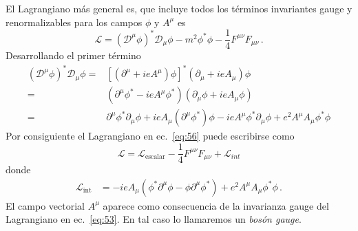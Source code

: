 El Lagrangiano m\'as general es, que incluye todos los t\'erminos invariantes gauge y renormalizables para los campos $\phi$ y $A^\mu$ es
\begin{equation}
  \label{eq:56}
  \mathcal{L}=\left(\mathcal{D}^\mu\phi\right)^*\mathcal{D}_\mu\phi-m^2\phi^*\phi-\frac{1}{4}F^{\mu\nu}F_{\mu\nu}\,.
\end{equation}
Desarrollando el primer t\'ermino
\begin{align}
  \left(\mathcal{D}^\mu\phi\right)^*\mathcal{D}_\mu\phi=&\left[\left(\partial^\mu+ieA^\mu\right)\phi\right]^*\left(\partial_\mu+ieA_\mu\right)\phi\nonumber\\  
  =&\left(\partial^\mu\phi^*-ieA^\mu\phi^*\right)\left(\partial_\mu\phi+ieA_\mu\phi\right)\nonumber\\
  =&\partial^\mu\phi^*\partial_\mu\phi+ieA_\mu(\partial^\mu\phi^*)\phi-ieA^\mu\phi^*\partial_\mu\phi+e^2A^\mu A_\mu\phi^*\phi
\end{align}
Por consiguiente el Lagrangiano en ec.~\eqref{eq:56} puede escribirse como
\begin{equation}
  \label{eq:250}
  \mathcal{L}=\mathcal{L}_{\text{escalar}}-\frac{1}{4}F^{\mu\nu}F_{\mu\nu}+\mathcal{L}_{int}
\end{equation}
donde
\begin{align}
  \label{eq:73}
  \mathcal{L}_{\text{int}}&=-ieA_\mu(\phi^*\partial^\mu\phi-\phi\partial^\mu\phi^*)+e^2A^\mu A_\mu\phi^*\phi\,.
\end{align}
El campo vectorial $A^\mu$ aparece como consecuencia de la invarianza gauge del Lagrangiano en ec.~\eqref{eq:53}. En tal caso lo llamaremos un \emph{bos\'on gauge}. 

